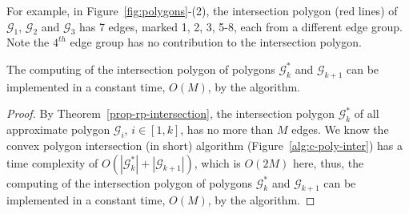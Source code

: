 For example, in Figure~\ref{fig:polygons}-(2), the intersection polygon (red lines) of $\mathcal{G}_1$, $\mathcal{G}_2$ and $\mathcal{G}_3$ has 7 edges, marked 1, 2, 3, 5-8, each from a different edge group. Note the $4^{th}$ edge group has no contribution to the intersection polygon.

\begin{cor}
\label{prop-cpi-time}
The computing of the intersection polygon of polygons $\mathcal{G}^*_k$ and $\mathcal{G}_{k+1}$ can be implemented in a constant time, \ie $O(M)$, by the \cpia algorithm.
\end{cor}

\begin{proof}
By Theorem~\ref{prop-rp-intersection}, the intersection polygon $\mathcal{G}^*_k$ of all approximate polygon $\mathcal{G}_i$, $i \in [1, k]$, has no more than $M$ edges.
We know the convex polygon intersection (\cpia in short) algorithm (Figure~\ref{alg:c-poly-inter}) has a time complexity of $O(|\mathcal{G}^*_k| + |\mathcal{G}_{k+1}|)$, which is $O(2M)$ here, thus, the computing of the intersection polygon of polygons $\mathcal{G}^*_k$ and $\mathcal{G}_{k+1}$ can be implemented in a constant time, \ie $O(M)$, by the \cpia algorithm.
\end{proof}





